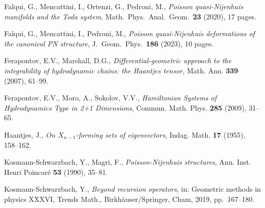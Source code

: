 \documentclass[12pt]{article}
\begin{document}

 Falqui, G., Mencattini, I., Ortenzi, G., Pedroni, M.,
{\it Poisson quasi-Nijenhuis manifolds and the Toda system\/}, Math.\ Phys.\ Anal.\ Geom.\ {\bf 23} (2020), 17 pages.

 Falqui, G., Mencattini, I., Pedroni, M.,
{\it Poisson quasi-Nijenhuis deformations of the canonical PN structure\/}, J.\ Geom.\ Phys.\  {\bf 186} (2023), 10 pages.



 Ferapontov, E.V., Marshall, D.G., {\it Differential-geometric approach to the integrability of hydrodynamic chains: the Haantjes tensor}, Math. Ann. {\bf 339} (2007), 61--99.

 Ferapontov, E.V., Moro, A., Sokolov, V.V., {\it Hamiltonian Systems of Hydrodynamics Type in 2+1 Dimensions}, 
Commun. Math. Phys. {\bf 285} (2009), 31--65.  



 Haantjes, J., {\it On $X_{n-1}$-forming sets of eigenvectors}, Indag. Math. {\bf 17} (1955), 158--162.


 Kosmann-Schwarzbach, Y., Magri, F., {\it Poisson-Nijenhuis structures}, Ann. Inst. Henri Poincar\'e {\bf 53} (1990), 35--81.

 Kosmann-Schwarzbach, Y., {\it Beyond recursion operators}, in: 
Geometric methods in physics XXXVI, Trends Math., Birkh\"auser/Springer, Cham, 2019, pp.\ 167--180.

\end{document}
